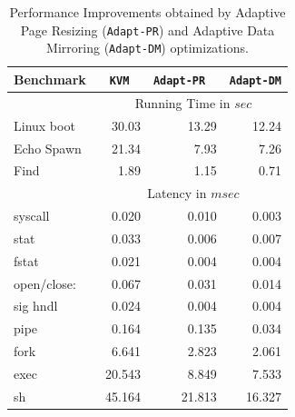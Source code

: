 \documentclass[10pt,twocolumn]{article}
\begin{document}
\begin{table}
\centering
      \begin{tabular}{|l| r r r |} \hline
        Benchmark\verb, ,& {\tt KVM} \verb, , & {\tt Adapt-PR} \verb, , & {\tt Adapt-DM}  \\ \hline
     & \multicolumn{3}{c|}{ Running Time in $sec$}\\ \cline {2-4}  
Linux boot	&	30.03	&	13.29	&	12.24	\\
Echo Spawn	&	21.34	&	7.93	&	7.26	\\
Find	&	1.89	&	1.15	&	0.71	\\
\cline{2-4}
	   
     & \multicolumn{3}{c|}{Latency in $msec$}\\  \cline{2-4}
syscall	&	0.020	&	0.010	&	0.003	\\
stat	&	0.033	&	0.006	&	0.007	\\
fstat	&	0.021	&	0.004	&	0.004	\\
open/close:	&	0.067	&	0.031	&	0.014	\\
sig hndl	&	0.024	&	0.004	&	0.004	\\
pipe 	&	0.164	&	0.135	&	0.034	\\
fork	&	6.641	&	2.823	&	2.061	\\
exec	&	20.543	&	8.849	&	7.533	\\
sh	&	45.164	&	21.813	&	16.327	\\
 \hline
      \end{tabular}
\label{tab:detailed_results}
\caption{Performance Improvements obtained by Adaptive Page Resizing ({\tt Adapt-PR}) and Adaptive Data Mirroring ({\tt Adapt-DM}) optimizations.}
\end{table} 
\end{document}
